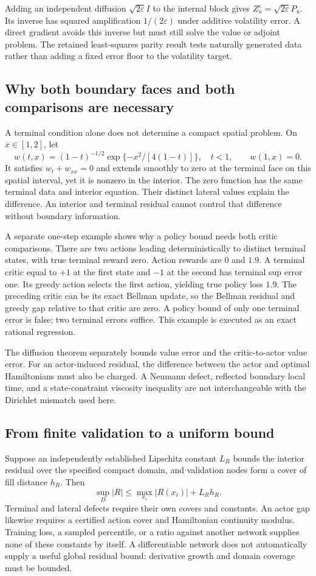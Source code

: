 Adding an independent diffusion $\sqrt{2\varepsilon}I$ to the internal block gives $Z_u^\varepsilon=\sqrt{2\varepsilon}P_u$. Its inverse has squared amplification $1/(2\varepsilon)$ under additive volatility error. A direct gradient avoids this inverse but must still solve the value or adjoint problem. The retained least-squares parity result tests naturally generated data rather than adding a fixed error floor to the volatility target.

\subsection{Why both boundary faces and both comparisons are necessary}
A terminal condition alone does not determine a compact spatial problem. On $x\in[1,2]$, let
\[
 w(t,x)=(1-t)^{-1/2}\exp\{-x^2/[4(1-t)]\},\quad t<1,\qquad w(1,x)=0.
\]
It satisfies $w_t+w_{xx}=0$ and extends smoothly to zero at the terminal face on this spatial interval, yet it is nonzero in the interior. The zero function has the same terminal data and interior equation. Their distinct lateral values explain the difference. An interior and terminal residual cannot control that difference without boundary information.

A separate one-step example shows why a policy bound needs both critic comparisons. There are two actions leading deterministically to distinct terminal states, with true terminal reward zero. Action rewards are $0$ and $1.9$. A terminal critic equal to $+1$ at the first state and $-1$ at the second has terminal sup error one. Its greedy action selects the first action, yielding true policy loss $1.9$. The preceding critic can be its exact Bellman update, so the Bellman residual and greedy gap relative to that critic are zero. A policy bound of only one terminal error is false; two terminal errors suffice. This example is executed as an exact rational regression.

The diffusion theorem separately bounds value error and the critic-to-actor value error. For an actor-induced residual, the difference between the actor and optimal Hamiltonians must also be charged. A Neumann defect, reflected boundary local time, and a state-constraint viscosity inequality are not interchangeable with the Dirichlet mismatch used here.

\subsection{From finite validation to a uniform bound}
Suppose an independently established Lipschitz constant $L_R$ bounds the interior residual over the specified compact domain, and validation nodes form a cover of fill distance $h_R$. Then
\[
 \sup_D|R|\leq\max_{x_i}|R(x_i)|+L_Rh_R.
\]
Terminal and lateral defects require their own covers and constants. An actor gap likewise requires a certified action cover and Hamiltonian continuity modulus. Training loss, a sampled percentile, or a ratio against another network supplies none of these constants by itself. A differentiable network does not automatically supply a useful global residual bound: derivative growth and domain coverage must be bounded.

